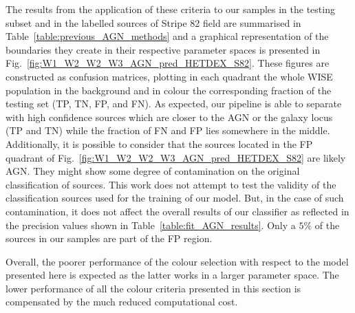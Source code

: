 \documentclass{aa}
\begin{document}
The results from the application of these criteria to our samples in the testing subset and in the labelled sources of Stripe 82 field are summarised in Table~\ref{table:previous_AGN_methods} and a graphical representation of the boundaries they create in their respective parameter spaces is presented in Fig.~\ref{fig:W1_W2_W2_W3_AGN_pred_HETDEX_S82}. These figures are constructed as confusion matrices, plotting in each quadrant the whole WISE population in the background and in colour the corresponding fraction of the testing set (TP, TN, FP, and FN). As expected, our pipeline is able to separate with high confidence sources which are closer to the AGN or the galaxy locus (TP and TN) while the fraction of FN and FP lies somewhere in the middle. Additionally, it is possible to consider that the sources located in the FP quadrant of Fig.~\ref{fig:W1_W2_W2_W3_AGN_pred_HETDEX_S82} are likely AGN. They might show some degree of contamination on the original classification of sources. This work does not attempt to test the validity of the classification sources used for the training of our model. But, in the case of such contamination, it does not affect the overall results of our classifier as reflected in the precision values shown in Table~\ref{table:fit_AGN_results}. Only a $5\%$ of the sources in our samples are part of the FP region.

Overall, the poorer performance of the colour selection with respect to the model presented here is expected as the latter works in a larger parameter space. The lower performance of all the colour criteria presented in this section is compensated by the much reduced computational cost.
\end{document}
